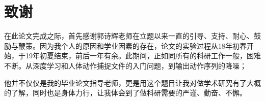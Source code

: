 

\chapter*{致谢}

在此论文完成之际，首先感谢郭诗辉老师在立题以来一直的引导、支持、耐心、鼓励与鞭策。因为我个人的原因和学业因素的存在，论文的实验过程从18年初春开始，于19年初夏结束，前后一年有余。此期间，正如同所有的科研工作一般，困难不断。从深度学习和人体动作捕捉文件的入门问题，到输出动作序列的降噪；

他并不仅仅是我的毕业论文指导老师，更是用这个题目让我对做学术研究有了大概的了解，同时也是身体力行，让我体会到了做科研需要的严谨、勤奋、不懈。


%
%
%
